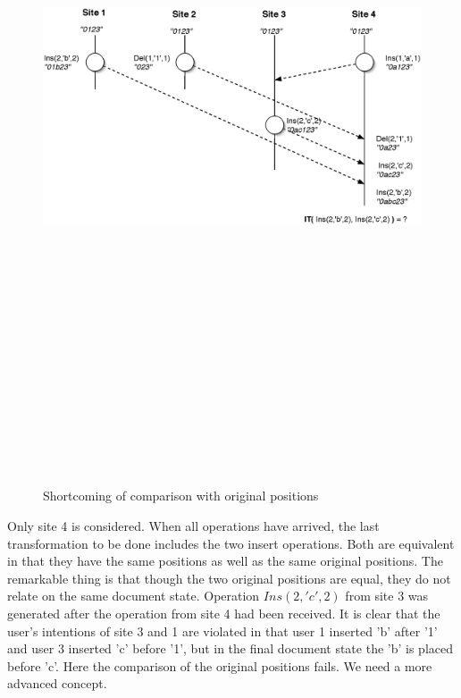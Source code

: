 \begin{itemize}
\begin{figure}[H]
\centering
\includegraphics[height=8.56in,width=4.92in]{../../images/algo-impl/transform_ins_ins_lsp.eps}
\caption{Shortcoming of comparison with original positions}
\label{Shortcoming of comparison with original positions}
\end{figure}

Only site 4 is considered. When all operations have arrived, the last transformation to be done includes the two insert operations. Both are equivalent in that they have the same positions as well as the same original positions. The remarkable thing is that though the two original positions are equal, they do not relate on the same document state. Operation $Ins(2,'c',2)$ from site 3 was generated after the operation from site 4 had been received. It is clear that the user's intentions of site 3 and 1 are violated in that user 1 inserted 'b' after '1' and user 3 inserted 'c' before '1', but in the final document state the 'b' is placed before 'c'. Here the comparison of the original positions fails. We need a more advanced concept. 


\end{itemize}
